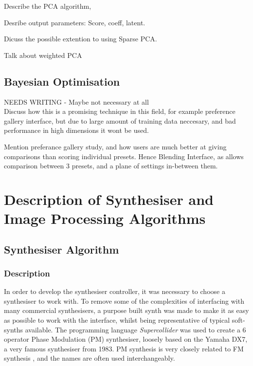 \documentclass[11pt, oneside]{report}   	%
\begin{document}

Describe the PCA algorithm, 

Desribe output parameters: Score, coeff, latent.

Dicuss the possible extention to using Sparse PCA. 

Talk about weighted PCA 
\section{Bayesian Optimisation}
NEEDS WRITING - Maybe not necessary at all\\
Discuss how this is a promising technique in this field, for example preference gallery interface, but due to large amount of training data neccesary, and bad performance in high dimensions it wont be used.

Mention preferance gallery study, and how users are much better at giving comparisons than scoring individual presets. Hence Blending Interface, as allows comparison between 3 presets, and a plane of settings in-between them.

\chapter{Description of Synthesiser and Image Processing Algorithms}
\section{Synthesiser Algorithm}
\subsection{Description}
In order to develop the synthesiser controller, it was necessary to choose a synthesiser to work with. To remove some of the complexities of interfacing with many commercial synthesisers, a purpose built synth was made to make it as easy as possible to work with the interface, whilst being representative of typical soft-synths available.
The programming language \emph{Supercollider} was used to create a 6 operator Phase Modulation (PM) synthesiser, loosely based on the Yamaha DX7, a very famous synthesiser from 1983. PM synthesis is very closely related to FM synthesis \cite{FM}, and the names are often used interchangeably.
 
\end{document}

